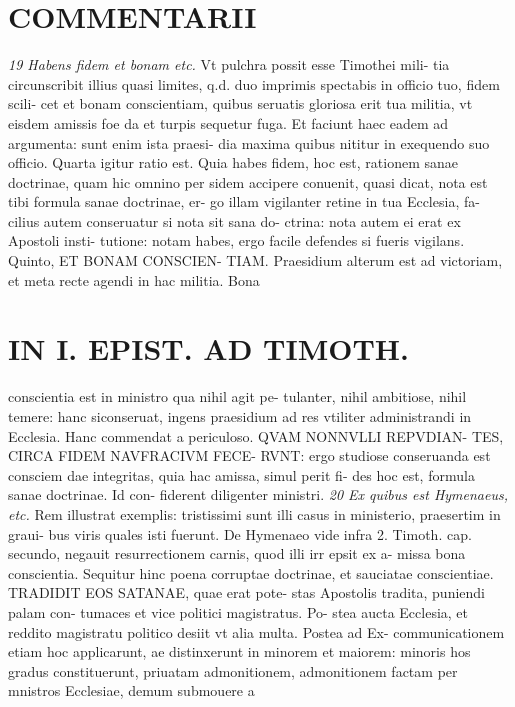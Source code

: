 \documentclass{article}
\begin{document}
\begin{pages}
\section*{COMMENTARII }
\textit{19 Habens fidem et bonam etc. }\pstart Vt pulchra possit esse Timothei mili- tia circunscribit illius quasi limites, q.d. duo imprimis spectabis in officio tuo, fidem scili- cet et bonam conscientiam, quibus seruatis gloriosa erit tua militia, vt eisdem amissis foe da et turpis sequetur fuga. Et faciunt haec eadem ad argumenta: sunt enim ista praesi- dia maxima quibus nititur in exequendo suo officio.  \pend\pstart Quarta igitur ratio est. Quia habes fidem, hoc est, rationem sanae doctrinae, quam hic omnino per sidem accipere conuenit, quasi dicat, nota est tibi formula sanae doctrinae, er- go illam vigilanter retine in tua Ecclesia, fa- cilius autem conseruatur si nota sit sana do- ctrina: nota autem ei erat ex Apostoli insti- tutione: notam habes, ergo facile defendes si fueris vigilans.  \pend\pstart Quinto, ET BONAM CONSCIEN- TIAM. Praesidium alterum est ad victoriam, et meta recte agendi in hac militia. Bona  \pend
\section*{IN I. EPIST. AD TIMOTH. }\pstart conscientia est in ministro qua nihil agit pe- tulanter, nihil ambitiose, nihil temere: hanc siconseruat, ingens praesidium ad res vtiliter administrandi in Ecclesia. Hanc commendat a periculoso. QVAM NONNVLLI REPVDIAN- TES, CIRCA FIDEM NAVFRACIVM FECE- RVNT: ergo studiose conseruanda est consciem dae integritas, quia hac amissa, simul perit fi- des hoc est, formula sanae doctrinae. Id con- fiderent diligenter ministri.  \pend
\textit{20 Ex quibus est Hymenaeus, etc. }\pstart Rem illustrat exemplis: tristissimi sunt illi casus in ministerio, praesertim in graui- bus viris quales isti fuerunt. De Hymenaeo vide infra 2. Timoth. cap. secundo, negauit resurrectionem carnis, quod illi irr epsit ex a- missa bona conscientia. Sequitur hinc poena corruptae doctrinae, et sauciatae conscientiae. TRADIDIT EOS SATANAE, quae erat pote- stas Apostolis tradita, puniendi palam con- tumaces et vice politici magistratus. Po- stea aucta Ecclesia, et reddito magistratu politico desiit vt alia multa. Postea ad Ex- communicationem etiam hoc applicarunt, ae distinxerunt in minorem et maiorem: minoris hos gradus constituerunt, priuatam admonitionem, admonitionem factam per mnistros Ecclesiae, demum submouere a  \pend
\marginpar{[ p.41 ]}
\marginpar{[ p.42 ]}

\end{pages}
\end{document}
